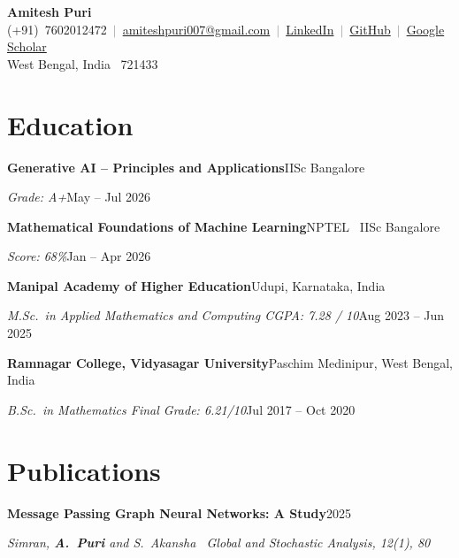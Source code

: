 \documentclass[a4paper,10pt]{article}
\newcommand{\row}[2]{\noindent#1\hfill#2\par}
\newcommand{\sep}{\,\textcolor{gray}{$|$}\,}
\begin{document}
\begin{center}
  {\LARGE\bfseries Amitesh Puri}\\[3pt]
  {\small (+91)~7602012472 \sep
    \href{mailto:amiteshpuri007@gmail.com}{amiteshpuri007@gmail.com} \sep
    \href{https://www.linkedin.com/in/amitesh-puri-7b6b991aa/}{LinkedIn} \sep
    \href{https://github.com/AmiteshPuri}{GitHub} \sep
    \href{https://scholar.google.com/citations?user=-C3E7g8AAAAJ}{Google Scholar}}\\[3pt]
  {\small West Bengal, India \textperiodcentered\ 721433}
\end{center}

\section{Education}

\row{\textbf{Generative AI -- Principles and Applications}}{IISc Bangalore}
\row{\textit{Grade: A+}}{May -- Jul 2026}
\vspace{2pt}

\row{\textbf{Mathematical Foundations of Machine Learning}}{NPTEL \textperiodcentered\ IISc Bangalore}
\row{\textit{Score: 68\%}}{Jan -- Apr 2026}
\vspace{2pt}

\row{\textbf{Manipal Academy of Higher Education}}{Udupi, Karnataka, India}
\row{\textit{M.Sc.\ in Applied Mathematics and Computing \quad CGPA: 7.28 / 10}}{Aug 2023 -- Jun 2025}
\vspace{2pt}

\row{\textbf{Ramnagar College, Vidyasagar University}}{Paschim Medinipur, West Bengal, India}
\row{\textit{B.Sc.\ in Mathematics \quad Final Grade: 6.21/10}}{Jul 2017 -- Oct 2020}

\section{Publications}

\row{\textbf{Message Passing Graph Neural Networks: A Study}}{2025}
\row{\textit{Simran, \textbf{A.~Puri} and S.~Akansha \textperiodcentered\ Global and Stochastic Analysis, 12(1), 80}}{}
\end{document}
